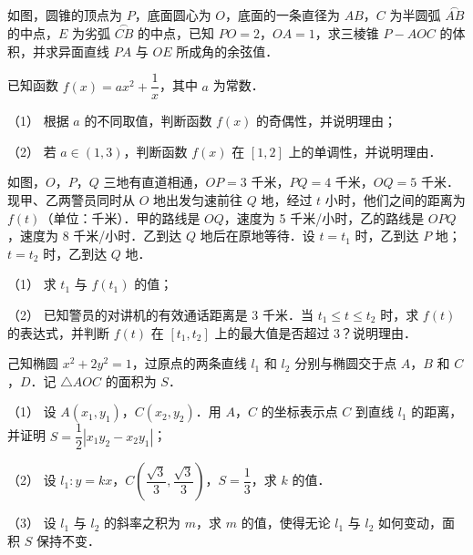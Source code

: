 \Needspace{0.4\textheight}
\begin{question}
如图，圆锥的顶点为 \(P\)，底面圆心为 \(O\)，底面的一条直径为 \(AB\)，\(C\) 为半圆弧 \(\overset{\frown}{AB}\) 的中点，\(E\) 为劣弧 \(\overset{\frown}{CB}\) 的中点，已知 \(PO=2\)，\(OA=1\)，求三棱锥 \(P-AOC\) 的体积，并求异面直线 \(PA\) 与 \(OE\) 所成角的余弦值．
\nopagebreak[4]
\begin{center}\end{center}
\nopagebreak[4]
\end{question}
\begin{question}
已知函数 \(f(x)=ax^{2}+\dfrac{1}{x}\)，其中 \(a\) 为常数．

（1） 根据 \(a\) 的不同取值，判断函数 \(f(x)\) 的奇偶性，并说明理由；

（2） 若 \(a\in(1,3)\)，判断函数 \(f(x)\) 在 \([1,2]\) 上的单调性，并说明理由．

\Needspace{0.4\textheight}
\end{question}
\begin{question}
如图，\(O\)，\(P\)，\(Q\) 三地有直道相通，\(OP=3\) 千米，\(PQ=4\) 千米，\(OQ=5\) 千米．现甲、乙两警员同时从 \(O\) 地出发匀速前往 \(Q\) 地，经过 \(t\) 小时，他们之间的距离为 \(f(t)\)（单位：千米）．甲的路线是 \(OQ\)，速度为 5 千米/小时，乙的路线是 \(OPQ\)，速度为 8 千米/小时．乙到达 \(Q\) 地后在原地等待．设 \(t=t_{1}\) 时，乙到达 \(P\) 地；\(t=t_{2}\) 时，乙到达 \(Q\) 地．

（1） 求 \(t_{1}\) 与 \(f(t_{1})\) 的值；

（2） 已知警员的对讲机的有效通话距离是 3 千米．当 \(t_{1}\leqslant t\leqslant t_{2}\) 时，求 \(f(t)\) 的表达式，并判断 \(f(t)\) 在 \([t_{1},t_{2}]\) 上的最大值是否超过 3？说明理由．
\nopagebreak[4]
\begin{center}\end{center}
\nopagebreak[4]
\end{question}
\begin{question}
己知椭圆 \(x^{2}+2y^{2}=1\)，过原点的两条直线 \(l_{1}\) 和 \(l_{2}\) 分别与椭圆交于点 \(A\)，\(B\) 和 \(C\)，\(D\)．记 \(\triangle AOC\) 的面积为 \(S\)．

（1） 设 \(A(x_{1},y_{1})\)，\(C(x_{2},y_{2})\)．用 \(A\)，\(C\) 的坐标表示点 \(C\) 到直线 \(l_{1}\) 的距离，并证明 \(S=\dfrac{1}{2}|x_{1}y_{2}-x_{2}y_{1}|\)；

（2） 设 \(l_{1}:y=kx\)，\(C\left(\dfrac{\sqrt{3}}{3},\dfrac{\sqrt{3}}{3}\right)\)，\(S=\dfrac{1}{3}\)，求 \(k\) 的值．

（3） 设 \(l_{1}\) 与 \(l_{2}\) 的斜率之积为 \(m\)，求 \(m\) 的值，使得无论 \(l_{1}\) 与 \(l_{2}\) 如何变动，面积 \(S\) 保持不变．

\end{question}
